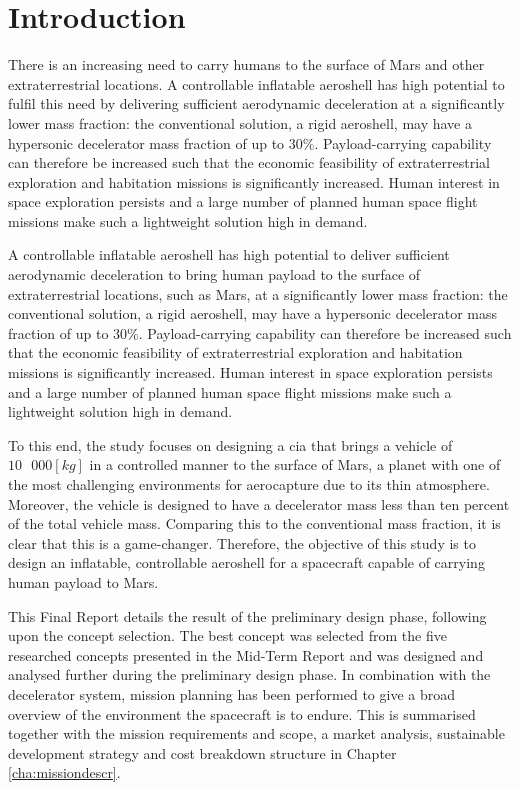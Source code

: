 \section{Introduction}
\label{cha:introduction}
There is an increasing need to carry humans to the surface of Mars and other extraterrestrial locations. A controllable inflatable aeroshell has high potential to fulfil this need by delivering sufficient aerodynamic deceleration at a significantly lower mass fraction: the conventional solution, a rigid aeroshell, may have a hypersonic decelerator mass fraction of up to $30\%$. Payload-carrying capability can therefore be increased such that the economic feasibility of extraterrestrial exploration and habitation missions is significantly increased. Human interest in space exploration persists and a large number of planned human space flight missions make such a lightweight solution high in demand. 

A controllable inflatable aeroshell has high potential to deliver sufficient aerodynamic deceleration to bring human payload to the surface of extraterrestrial locations, such as Mars, at a significantly lower mass fraction: the conventional solution, a rigid aeroshell, may have a hypersonic decelerator mass fraction of up to $30\%$. Payload-carrying capability can therefore be increased such that the economic feasibility of extraterrestrial exploration and habitation missions is significantly increased. Human interest in space exploration persists and a large number of planned human space flight missions make such a lightweight solution high in demand. 

To this end, the study focuses on designing a \acrfull{cia} that brings a vehicle of $10\mbox{ }000 [kg]$ in a controlled manner to the surface of Mars, a planet with one of the most challenging environments for aerocapture due to its thin atmosphere. Moreover, the vehicle is designed to have a decelerator mass less than ten percent of the total vehicle mass. Comparing this to the conventional mass fraction, it is clear that this is a game-changer. Therefore, the objective of this study is to design an inflatable, controllable aeroshell for a spacecraft capable of carrying human payload to Mars.

This Final Report details the result of the preliminary design phase, following upon the concept selection. The best concept was selected from the five researched concepts presented in the Mid-Term Report and was designed and analysed further during the preliminary design phase. In combination with the decelerator system, mission planning has been performed to give a broad overview of the environment the spacecraft is to endure. This is summarised together with the mission requirements and scope, a market analysis, sustainable development strategy and cost breakdown structure in Chapter \ref{cha:missiondescr}.

